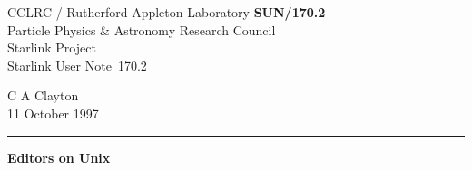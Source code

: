 \documentclass[twoside,11pt]{article}
\newcommand{\stardoccategory}  {Starlink User Note}
\newcommand{\stardocinitials}  {SUN}
\newcommand{\stardocnumber}    {170.2}
\newcommand{\stardocauthors}   {C A Clayton}
\newcommand{\stardocdate}      {11 October 1997}
\newcommand{\stardoctitle}     {Editors on Unix}
\newcommand{\stardocname}{\stardocinitials /\stardocnumber}
\newenvironment{latexonly}{}{}
\begin{document}
\thispagestyle{empty}

\begin{latexonly}
   CCLRC / {\sc Rutherford Appleton Laboratory} \hfill {\bf \stardocname}\\
   {\large Particle Physics \& Astronomy Research Council}\\
   {\large Starlink Project\\}
   {\large \stardoccategory\ \stardocnumber}
   \begin{flushright}
   \stardocauthors\\
   \stardocdate
   \end{flushright}
   \vspace{-4mm}
   \rule{\textwidth}{0.5mm}
   \vspace{5mm}
   \begin{center}
   {\Huge\bf  \stardoctitle \\ [2.5ex]}
   \end{center}
   \vspace{5mm}

\end{latexonly}
\end{document}
